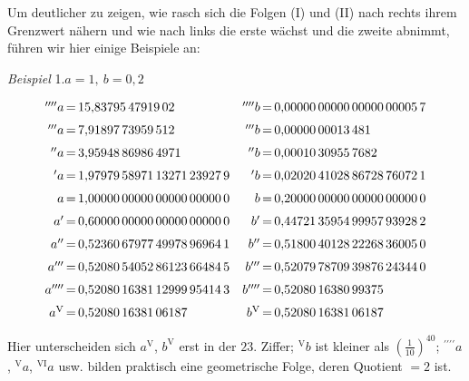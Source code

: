 \begingroup
\renewcommand{\arraystretch}{1.45}

Um deutlicher zu zeigen, wie rasch sich die Folgen (I) und (II) nach rechts
ihrem Grenzwert nähern und wie nach links die erste wächst und die zweite
abnimmt, führen wir hier einige Beispiele an:

\begin{center}\textit{Beispiel} 1.\quad $a=1,\ b=0{,}2$\end{center}
\begingroup\small\setlength{\arraycolsep}{0pt}
\[\begin{array}{r@{\,=\,}l@{\quad}r@{\,=\,}l}
{}^{\prime\prime\prime\prime}a&15{,}83795\,47919\,02&{}^{\prime\prime\prime\prime}b&0{,}00000\,00000\,00000\,00005\,7\\[6pt]
{}^{\prime\prime\prime}a&7{,}91897\,73959\,512&{}^{\prime\prime\prime}b&0{,}00000\,00013\,481\\[6pt]
{}^{\prime\prime}a&3{,}95948\,86986\,4971&{}^{\prime\prime}b&0{,}00010\,30955\,7682\\[6pt]
{}^{\prime}a&1{,}97979\,58971\,13271\,23927\,9&{}^{\prime}b&0{,}02020\,41028\,86728\,76072\,1\\[6pt]
a&1{,}00000\,00000\,00000\,00000\,0&b&0{,}20000\,00000\,00000\,00000\,0\\[6pt]
a'&0{,}60000\,00000\,00000\,00000\,0&b'&0{,}44721\,35954\,99957\,93928\,2\\[6pt]
a''&0{,}52360\,67977\,49978\,96964\,1&b''&0{,}51800\,40128\,22268\,36005\,0\\[6pt]
a'''&0{,}52080\,54052\,86123\,66484\,5&b'''&0{,}52079\,78709\,39876\,24344\,0\\[6pt]
a''''&0{,}52080\,16381\,12999\,95414\,3&b''''&0{,}52080\,16380\,99375\\[6pt]
a^{\mathrm V}&0{,}52080\,16381\,06187&b^{\mathrm V}&0{,}52080\,16381\,06187
\end{array}
\]\endgroup

Hier unterscheiden sich $a^{\mathrm V}$, $b^{\mathrm V}$ erst in der $23.$ Ziffer;
${}^{\mathrm V}b$ ist kleiner als $(\frac{1}{10})^{40}$;
${}^{\prime\prime\prime\prime}a$, ${}^{\mathrm V}a$, ${}^{\mathrm{VI}}a$ usw.
bilden praktisch eine geometrische Folge, deren Quotient $=2$ ist.

